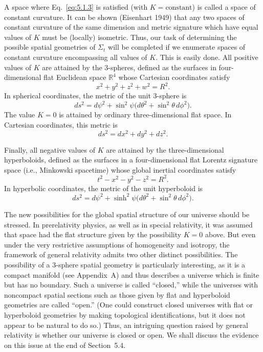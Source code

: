 A space where Eq.~\eqref{eq:5.1.3} is satisfied (with \(K=\text{constant}\)) is
called a space of constant curvature. It can be shown (Eisenhart 1949) that any two
spaces of constant curvature of the same dimension and metric signature which have
equal values of \(K\) must be (locally) isometric. Thus, our task of determining the
possible spatial geometries of \(\Sigma_t\) will be completed if we enumerate spaces
of constant curvature encompassing all values of \(K\). This is easily done. All
positive values of \(K\) are attained by the 3-spheres, defined as the surfaces in
four-dimensional flat Euclidean space \(\mathbb{R}^4\) whose Cartesian coordinates
satisfy
\begin{equation}
  x^2+y^2+z^2+w^2=R^2.
  \tag{5.1.5}\label{eq:5.1.5}
\end{equation}
In spherical coordinates, the metric of the unit 3-sphere is
\begin{equation}
  ds^2=d\psi^2+\sin^2\psi\bigl(d\theta^2+\sin^2\theta\,d\phi^2\bigr).
  \tag{5.1.6}\label{eq:5.1.6}
\end{equation}
The value \(K=0\) is attained by ordinary three-dimensional flat space. In Cartesian
coordinates, this metric is
\begin{equation}
  ds^2=dx^2+dy^2+dz^2.
  \tag{5.1.7}\label{eq:5.1.7}
\end{equation}

Finally, all negative values of \(K\) are attained by the three-dimensional
hyperboloids, defined as the surfaces in a four-dimensional flat Lorentz signature
space (i.e., Minkowski spacetime) whose global inertial coordinates satisfy
\begin{equation}
  t^2-x^2-y^2-z^2=R^2.
  \tag{5.1.8}\label{eq:5.1.8}
\end{equation}
In hyperbolic coordinates, the metric of the unit hyperboloid is
\begin{equation}
  ds^2=d\psi^2+\sinh^2\psi\bigl(d\theta^2+\sin^2\theta\,d\phi^2\bigr).
  \tag{5.1.9}\label{eq:5.1.9}
\end{equation}

The new possibilities for the global spatial structure of our universe should be
stressed. In prerelativity physics, as well as in special relativity, it was assumed
that space had the flat structure given by the possibility \(K=0\) above. But even
under the very restrictive assumptions of homogeneity and isotropy, the framework
of general relativity admits two other distinct possibilities. The possibility of a
3-sphere spatial geometry is particularly interesting, as it is a compact manifold
(see Appendix~A) and thus describes a universe which is finite but has no boundary.
Such a universe is called ``closed,'' while the universes with noncompact spatial
sections such as those given by flat and hyperboloid geometries are called ``open.''
(One could construct closed universes with flat or hyperboloid geometries by making
topological identifications, but it does not appear to be natural to do so.) Thus, an
intriguing question raised by general relativity is whether our universe is closed or
open. We shall discuss the evidence on this issue at the end of Section~5.4.

